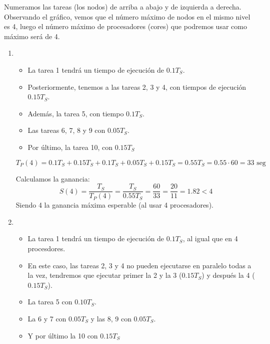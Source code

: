 \begin{ejercicio}
    Numeramos las tareas (los nodos) de arriba a abajo y de izquierda a derecha. 
    Observando el gráfico, vemos que el número máximo de nodos en el mismo nivel es 4, luego el número máximo de procesadores (cores) que podremos usar como máximo será de 4.

    \begin{enumerate}
        \item 
            \begin{itemize}
                \item La tarea 1 tendrá un tiempo de ejecución de $0.1T_S$.
                \item Posteriormente, tenemos a las tareas 2, 3 y 4, con tiempos de ejecución $0.15T_S$.
                \item Además, la tarea 5, con tiempo $0.1T_S$.
                \item Las tareas 6, 7, 8 y 9 con $0.05T_S$.
                \item Por último, la tarea 10, con $0.15T_S$
            \end{itemize}

            \begin{equation*}
                T_P(4) = 0.1T_S + 0.15T_S + 0.1T_S + 0.05T_S + 0.15T_S = 0.55T_S = 0.55\cdot 60 = 33 \text{\ seg}
            \end{equation*}

            Calculamos la ganancia:
            \begin{equation*}
                S(4) = \dfrac{T_S}{T_P(4)} = \dfrac{T_S}{0.55T_S} = \dfrac{60}{33} = \dfrac{20}{11} = 1.82 < 4
            \end{equation*}
            Siendo 4 la ganancia máxima esperable (al usar 4 procesadores).

        \item 
            \begin{itemize}
                \item La tarea 1 tendrá un tiempo de ejecución de $0.1T_S$, al igual que en 4 procesdores.
                \item En este caso, las tareas 2, 3 y 4 no pueden ejecutarse en paralelo todas a la vez, tendremos que ejecutar primer la 2 y la 3 ($0.15T_S$) y después la 4 ($0.15T_S$).
                \item La tarea 5 con $0.10T_S$.
                \item La 6 y 7 con $0.05T_S$ y las 8, 9 con $0.05T_S$.
                \item Y por último la 10 con $0.15T_S$
            \end{itemize}


\end{enumerate}
\end{ejercicio}
